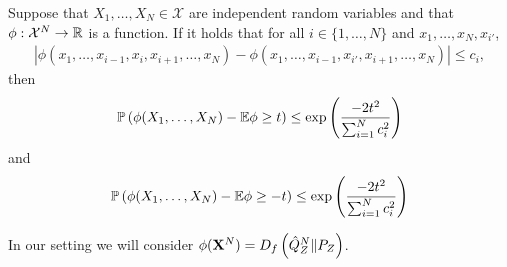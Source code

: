 \begin{theorem*}
Suppose that $X_1, \ldots, X_N \in \mathcal{X}$ are independent random variables and that $\phi : \mathcal{X}^N \to \mathbb{R}$ is a function. 
If it holds that for all $i\in\{1,\ldots,N\}$ and $x_1, \ldots, x_N, x_{i'}$, 
\begin{align*}
    \left| \phi(x_1, \ldots, x_{i-1}, x_i, x_{i+1}, \ldots, x_N) - \phi(x_1, \ldots, x_{i-1}, x_{i'}, x_{i+1}, \ldots, x_N)\right| \leq c_i,
\end{align*}
then
\begin{align*}
    \mathbb{P} \left(\phi(X_1,\ldots, X_N) - \mathbb{E}\phi \geq t \right) \leq \exp\left(\frac{-2t^2}{\sum_{i=1}^N c^2_i} \right)
\end{align*}
and
\begin{align*}
    \mathbb{P} \left(\phi(X_1,\ldots, X_N) - \mathbb{E}\phi \geq -t \right) \leq \exp\left(\frac{-2t^2}{\sum_{i=1}^N c^2_i} \right)
\end{align*}
\end{theorem*}

In our setting we will consider $\phi(\mathbf{X}^N) = D_f\left( \hat{Q}_Z^N \| P_Z\right)$.


